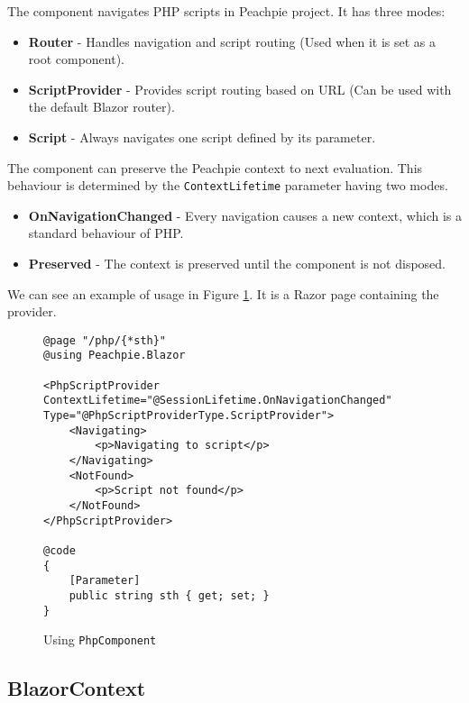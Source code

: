 The component navigates PHP scripts in Peachpie project. It has three modes:
\par
\begin{itemize}
\item \textbf{Router} - Handles navigation and script routing (Used when it is set as a root component).
\item \textbf{ScriptProvider} - Provides script routing based on URL (Can be used with the default Blazor router). 
\item \textbf{Script} - Always navigates one script defined by its parameter. 
\end{itemize}
\par
The component can preserve the Peachpie context to next evaluation. This behaviour is determined by the \texttt{ContextLifetime} parameter having two modes.
\par
\begin{itemize}
\item \textbf{OnNavigationChanged} - Every navigation causes a new context, which is a standard behaviour of PHP.
\item \textbf{Preserved} - The context is preserved until the component is not disposed.  
\end{itemize}
\par
We can see an example of usage in Figure \ref{img37:phpcomponent}. It is a Razor page containing the provider.
\par
\begin{figure}[b!]
\begin{lstlisting}
@page "/php/{*sth}"
@using Peachpie.Blazor

<PhpScriptProvider 
ContextLifetime="@SessionLifetime.OnNavigationChanged"
Type="@PhpScriptProviderType.ScriptProvider">
    <Navigating>
        <p>Navigating to script</p>
    </Navigating>
    <NotFound>
        <p>Script not found</p>
    </NotFound>
</PhpScriptProvider>

@code
{
    [Parameter]
    public string sth { get; set; }
}
\end{lstlisting}
\caption{Using \texttt{PhpComponent}}
\label{img37:phpcomponent}
\end{figure}

\subsection{BlazorContext}

